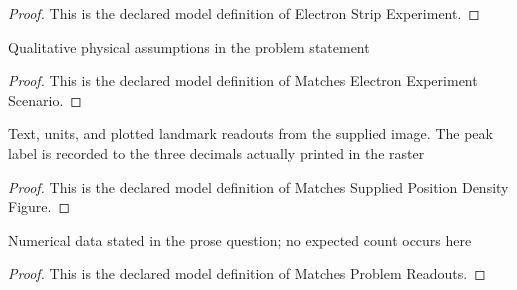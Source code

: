 \begin{proof}
  This is the declared model definition of Electron Strip Experiment.
\end{proof}
\begin{definition}
  \label{def:physics:phyx-mini-0501:phyxminiproblems-problemphyxmini0501-matcheselectronexperimentscenario}
  Qualitative physical assumptions in the problem statement
\end{definition}
\begin{proof}
  This is the declared model definition of Matches Electron Experiment Scenario.
\end{proof}
\begin{definition}
  \label{def:physics:phyx-mini-0501:phyxminiproblems-problemphyxmini0501-matchessuppliedpositiondensityfigure}
  Text, units, and plotted landmark readouts from the supplied image. The peak label is recorded to the three decimals actually printed in the raster
\end{definition}
\begin{proof}
  This is the declared model definition of Matches Supplied Position Density Figure.
\end{proof}
\begin{definition}
  \label{def:physics:phyx-mini-0501:phyxminiproblems-problemphyxmini0501-matchesproblemreadouts}
  Numerical data stated in the prose question; no expected count occurs here
\end{definition}
\begin{proof}
  This is the declared model definition of Matches Problem Readouts.
\end{proof}
